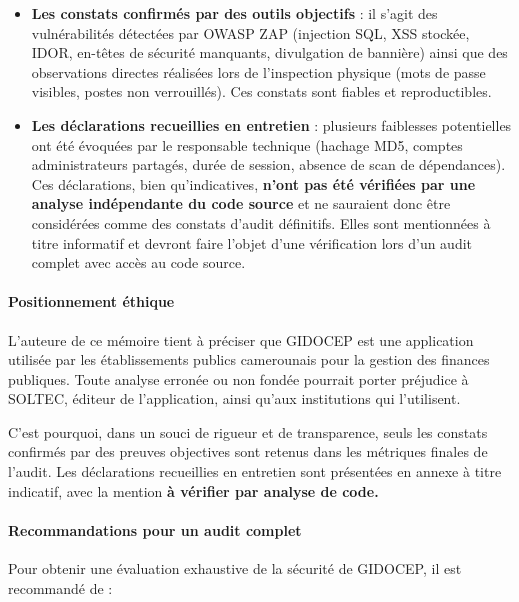 \documentclass[12pt,a4paper,oneside]{report}
\begin{document}
\begin{itemize}[label={\color{gold}}, leftmargin=*]
	\item \textbf{Les constats confirmés par des outils objectifs} : 
	il s'agit des vulnérabilités détectées par OWASP ZAP (injection SQL, 
	XSS stockée, IDOR, en-têtes de sécurité manquants, divulgation de 
	bannière) ainsi que des observations directes réalisées lors de 
	l'inspection physique (mots de passe visibles, postes non verrouillés). 
	Ces constats sont fiables et reproductibles.
	
	\item \textbf{Les déclarations recueillies en entretien} : 
	plusieurs faiblesses potentielles ont été évoquées par le responsable 
	technique (hachage MD5, comptes administrateurs partagés, durée de 
	session, absence de scan de dépendances). Ces déclarations, bien 
	qu'indicatives, \textbf{n'ont pas été vérifiées par une analyse 
		indépendante du code source} et ne sauraient donc être considérées 
	comme des constats d'audit définitifs. Elles sont mentionnées à 
	titre informatif et devront faire l'objet d'une vérification 
	lors d'un audit complet avec accès au code source.
\end{itemize}

\paragraph{Positionnement éthique}

L'auteure de ce mémoire tient à préciser que GIDOCEP est une application 
utilisée par les établissements publics camerounais pour la gestion des 
finances publiques. Toute analyse erronée ou non fondée pourrait porter 
préjudice à SOLTEC, éditeur de l'application, ainsi qu'aux institutions 
qui l'utilisent.

C'est pourquoi, dans un souci de rigueur et de transparence, seuls les 
constats confirmés par des preuves objectives sont retenus dans les 
métriques finales de l'audit. Les déclarations recueillies en entretien 
sont présentées en annexe à titre indicatif, avec la mention 
\textbf{à vérifier par analyse de code.}

\paragraph{Recommandations pour un audit complet}

Pour obtenir une évaluation exhaustive de la sécurité de GIDOCEP, 
il est recommandé de :
\end{document}

